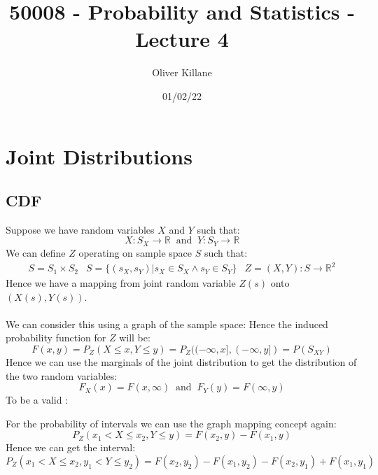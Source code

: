 \documentclass{report}
\title{50008 - Probability and Statistics - Lecture 4}
\author{Oliver Killane}
\date{01/02/22}
\begin{document}
\maketitle

\section*{Joint Distributions}
\subsection*{CDF}
Suppose we have random variables $X$ and $Y$ such that:
\[X: S_X \to \mathbb{R} \ \text{ and } \ Y: S_Y \to \mathbb{R}\]
We can define $Z$ operating on sample space $S$ such that:
\[\begin{matrix}
		S = S_1 \times S_2 & S = \{(s_X, s_Y) | s_X \in S_X \land s_Y \in S_Y\} & Z = (X, Y): S \to \mathbb{R}^2
	\end{matrix}\]
Hence we have a mapping from joint random variable $Z(s)$ onto $(X(s), Y(s))$.
\\
\\ We can consider this using a graph of the sample space:
Hence the induced probability function for $Z$ will be:
\[F(x,y) = P_Z(X \leq x, Y \leq y) = P_Z((-\infty, x], (- \infty, y]) = P(S_{XY})\]
Hence we can use the marginals of the joint distribution to get the distribution of the two random variables:
\[F_X(x) = F(x, \infty) \ \text{ and } \ F_Y(y) = F(\infty, y)\]
To be a valid :

For the probability of intervals we can use the graph mapping concept again:
\[P_Z(x_1 < X \leq x_2, Y \leq y) = F(x_2, y) - F(x_1, y)\]
Hence we can get the interval:
\[P_Z(x_1 < X \leq x_2, y_1 < Y \leq y_2) = F(x_2, y_2) - F(x_1, y_2) -F(x_2,y_1) + F(x_1,y_1)\]
\end{document}
